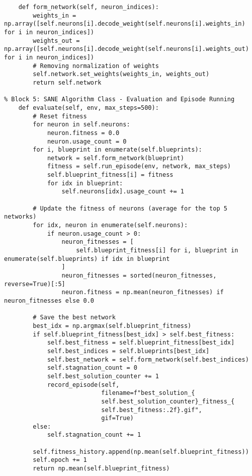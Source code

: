 \documentclass[a4paper,12pt]{article}
\begin{document}
\begin{lstlisting}
    def form_network(self, neuron_indices):
        weights_in = np.array([self.neurons[i].decode_weight(self.neurons[i].weights_in) for i in neuron_indices])
        weights_out = np.array([self.neurons[i].decode_weight(self.neurons[i].weights_out) for i in neuron_indices])
        # Removing normalization of weights
        self.network.set_weights(weights_in, weights_out)
        return self.network

% Block 5: SANE Algorithm Class - Evaluation and Episode Running
    def evaluate(self, env, max_steps=500):
        # Reset fitness
        for neuron in self.neurons:
            neuron.fitness = 0.0
            neuron.usage_count = 0
        for i, blueprint in enumerate(self.blueprints):
            network = self.form_network(blueprint)
            fitness = self.run_episode(env, network, max_steps)
            self.blueprint_fitness[i] = fitness
            for idx in blueprint:
                self.neurons[idx].usage_count += 1

        # Update the fitness of neurons (average for the top 5 networks)
        for idx, neuron in enumerate(self.neurons):
            if neuron.usage_count > 0:
                neuron_fitnesses = [
                    self.blueprint_fitness[i] for i, blueprint in enumerate(self.blueprints) if idx in blueprint
                ]
                neuron_fitnesses = sorted(neuron_fitnesses, reverse=True)[:5]
                neuron.fitness = np.mean(neuron_fitnesses) if neuron_fitnesses else 0.0

        # Save the best network
        best_idx = np.argmax(self.blueprint_fitness)
        if self.blueprint_fitness[best_idx] > self.best_fitness:
            self.best_fitness = self.blueprint_fitness[best_idx]
            self.best_indices = self.blueprints[best_idx]
            self.best_network = self.form_network(self.best_indices)
            self.stagnation_count = 0
            self.best_solution_counter += 1
            record_episode(self,
                           filename=f"best_solution_{
                           self.best_solution_counter}_fitness_{
                           self.best_fitness:.2f}.gif",
                           gif=True)
        else:
            self.stagnation_count += 1

        self.fitness_history.append(np.mean(self.blueprint_fitness))
        self.epoch += 1
        return np.mean(self.blueprint_fitness)


\end{lstlisting}
\end{document}

